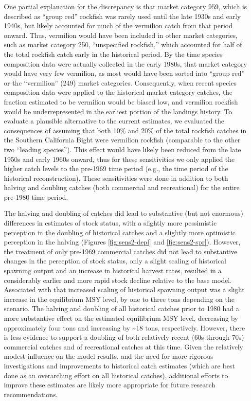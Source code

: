 \documentclass[11pt,
  english,
  a4paper,
]{article}
\begin{document}
One partial explanation for the discrepancy is that market category 959, which is described as ``group red'' rockfish was rarely used until the late 1930s and early 1940s, but likely accounted for much of the vermilion catch from that period onward. Thus, vermilion would have been included in other market categories, such as market category 250, ``unspecified rockfish,'' which accounted for half of the total rockfish catch early in the historical period. By the time species composition data were actually collected in the early 1980s, that market category would have very few vermilion, as most would have been sorted into ``group red'' or the ``vermilion'' (249) market categories. Consequently, when recent species composition data were applied to the historical market category catches, the fraction estimated to be vermilion would be biased low, and vermilion rockfish would be underrepresented in the earliest portion of the landings history. To evaluate a plausible alternative to the current estimates, we evaluated the consequences of assuming that both 10\% and 20\% of the total rockfish catches in the Southern California Bight were vermilion rockfish (comparable to the other two ``leading species''). This effect would have likely been reduced from the late 1950s and early 1960s onward, thus for these sensitivities we only applied the higher catch levels to the pre-1969 time period (e.g., the time period of the historical reconstruction). These sensitivities were done in addition to both halving and doubling catches (both commercial and recreational) for the entire pre-1980 time period.

The halving and doubling of catches did lead to substantive (but not enormous) differences in estimates of stock status, with a slightly more pessimistic perception in the doubling of historical catches and a slightly more optimistic perception in the halving (Figures \ref{fig:sens2-depl} and \ref{fig:sens2-spr}). However, the treatment of only pre-1969 commercial catches did not lead to substantive changes in the perception of stock status, only a slight scaling of historical spawning output and an increase in historical harvest rates, resulted in a considerably earlier and more rapid stock decline relative to the base model. Associated with that increased scaling of historical spawning output was a slight increase in the equilibrium MSY level, by one to three tons depending on the scenario. The halving and doubling of all historical catches prior to 1980 had a more substantive effect on the estimated equilibrium MSY level, decreasing by approximately four tons and increasing by \textasciitilde18 tons, respectively. However, there is less evidence to support a doubling of both relatively recent (60s through 70s) commercial catches and of recreational catches at this time. Given the relatively modest influence on the model results, and the need for more rigorous investigations and improvements to historical catch estimates (which are best done as an overarching effort on all historical catches), additional efforts to improve these estimates are likely more appropriate for future research recommendations.
\end{document}
